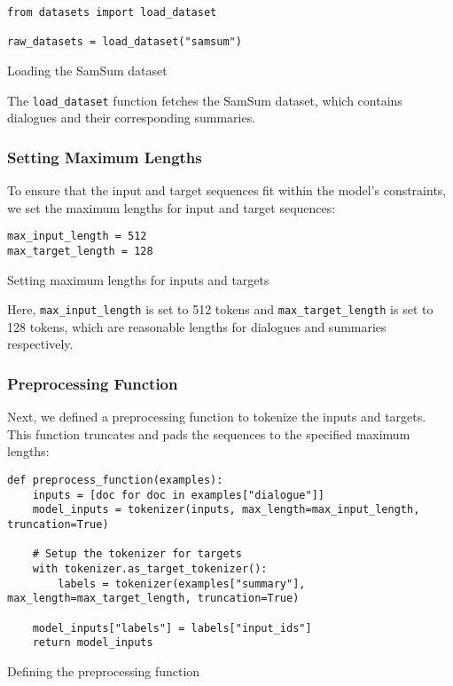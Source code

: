 \begin{listing}[H]
\begin{verbatim}
from datasets import load_dataset

raw_datasets = load_dataset("samsum")
\end{verbatim}
\caption{Loading the SamSum dataset}
\label{listing:Loading_SamSum}
\end{listing}

The \texttt{load\_dataset} function fetches the SamSum dataset, which contains dialogues and their corresponding summaries.

\subsubsection{Setting Maximum Lengths}

To ensure that the input and target sequences fit within the model's constraints, we set the maximum lengths for input and target sequences:

\begin{listing}[H]
\begin{verbatim}
max_input_length = 512
max_target_length = 128
\end{verbatim}
\caption{Setting maximum lengths for inputs and targets}
\label{listing:Max_Lengths}
\end{listing}

Here, \texttt{max\_input\_length} is set to 512 tokens and \texttt{max\_target\_length} is set to 128 tokens, which are reasonable lengths for dialogues and summaries respectively.

\subsubsection{Preprocessing Function}

Next, we defined a preprocessing function to tokenize the inputs and targets. This function truncates and pads the sequences to the specified maximum lengths:

\begin{listing}[H]
\begin{verbatim}
def preprocess_function(examples):
    inputs = [doc for doc in examples["dialogue"]]
    model_inputs = tokenizer(inputs, max_length=max_input_length, truncation=True)

    # Setup the tokenizer for targets
    with tokenizer.as_target_tokenizer():
        labels = tokenizer(examples["summary"], max_length=max_target_length, truncation=True)

    model_inputs["labels"] = labels["input_ids"]
    return model_inputs
\end{verbatim}
\caption{Defining the preprocessing function}
\label{listing:Preprocess_Function}
\end{listing}

